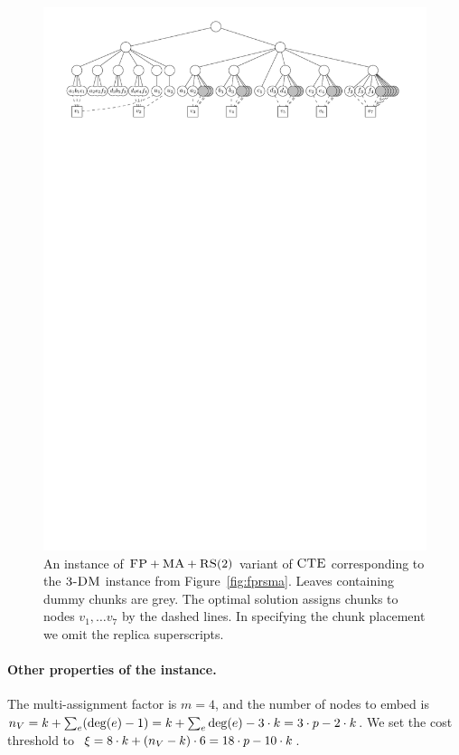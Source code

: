 \begin{figure}[t]
\centering
\includegraphics[width=1\columnwidth]{figs/static-mapping/cte-ma2.pdf}
\caption{An instance of $\textsc{FP}+\textsc{MA}+\textsc{RS}(2)$ variant of $\textsc{CTE}$ corresponding to the $\textsc{3-DM}$ instance from Figure~\ref{fig:fprsma}. Leaves containing dummy chunks are grey. The optimal solution assigns chunks to nodes $v_1, \ldots v_7$ by the dashed lines. In specifying the chunk placement we omit the replica superscripts.}
\label{fig:example-rs2}
\end{figure}


\paragraph{Other properties of the instance.}
The multi-assignment factor is $m=4$, and the number of nodes to embed is~$n_V = k + \sum_{e}(\deg(e)-1) = k + \sum_{e}\deg(e)-3\cdot k = 3\cdot p - 2\cdot k$.
 We set the cost threshold to~$\xi = 8\cdot k + (n_V-k)\cdot 6 = 18\cdot p - 10\cdot k$.

